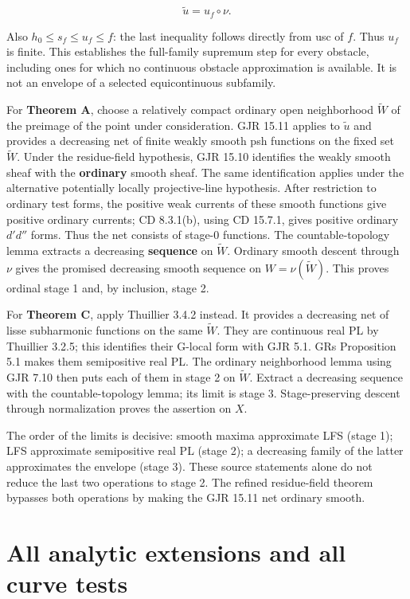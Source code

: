 \documentclass[
  11pt,
]{article}
\begin{document}
\[
\widetilde u=u_f\circ\nu.
\]

Also \(h_0\leq s_f\leq u_f\leq f\): the last inequality follows directly
from usc of \(f\). Thus \(u_f\) is finite. This establishes the
full-family supremum step for every obstacle, including ones for which
no continuous obstacle approximation is available. It is not an envelope
of a selected equicontinuous subfamily.

For \textbf{Theorem A}, choose a relatively compact ordinary open
neighborhood \(\widetilde W\) of the preimage of the point under
consideration. GJR 15.11 applies to \(\widetilde u\) and provides a
decreasing net of finite weakly smooth psh functions on the fixed set
\(\widetilde W\). Under the residue-field hypothesis, GJR 15.10
identifies the weakly smooth sheaf with the \textbf{ordinary} smooth
sheaf. The same identification applies under the alternative potentially
locally projective-line hypothesis. After restriction to ordinary test
forms, the positive weak currents of these smooth functions give
positive ordinary currents; CD 8.3.1(b), using CD 15.7.1, gives positive
ordinary \(d'd''\) forms. Thus the net consists of stage-0 functions.
The countable-topology lemma extracts a decreasing \textbf{sequence} on
\(\widetilde W\). Ordinary smooth descent through \(\nu\) gives the
promised decreasing smooth sequence on \(W=\nu(\widetilde W)\). This
proves ordinal stage 1 and, by inclusion, stage 2.

For \textbf{Theorem C}, apply Thuillier 3.4.2 instead. It provides a
decreasing net of lisse subharmonic functions on the same
\(\widetilde W\). They are continuous real PL by Thuillier 3.2.5; this
identifies their G-local form with GJR 5.1. GRs Proposition 5.1 makes
them semipositive real PL. The ordinary neighborhood lemma using GJR
7.10 then puts each of them in stage 2 on \(\widetilde W\). Extract a
decreasing sequence with the countable-topology lemma; its limit is
stage 3. Stage-preserving descent through normalization proves the
assertion on \(X\).

The order of the limits is decisive: smooth maxima approximate LFS
(stage 1); LFS approximate semipositive real PL (stage 2); a decreasing
family of the latter approximates the envelope (stage 3). These source
statements alone do not reduce the last two operations to stage 2. The
refined residue-field theorem bypasses both operations by making the GJR
15.11 net ordinary smooth.

\section{All analytic extensions and all curve
tests}\label{all-analytic-extensions-and-all-curve-tests}
\end{document}

